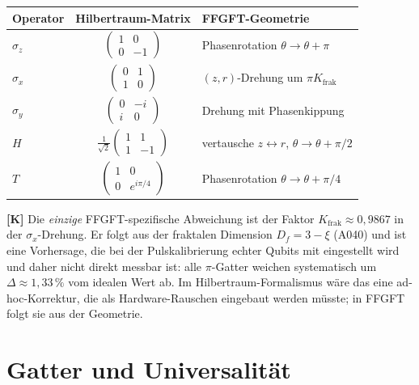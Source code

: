 \begin{center}
\renewcommand{\arraystretch}{1.4}
{\small
\begin{tabular}{lcl}
\toprule
\textbf{Operator} & \textbf{Hilbertraum-Matrix} & \textbf{FFGFT-Geometrie} \\
\midrule
$\sigma_z$ & $\begin{pmatrix}1&0\\0&-1\end{pmatrix}$ & Phasenrotation $\theta\to\theta+\pi$ \\
$\sigma_x$ & $\begin{pmatrix}0&1\\1&0\end{pmatrix}$ & $(z,r)$-Drehung um $\pi K_{\text{frak}}$ \\
$\sigma_y$ & $\begin{pmatrix}0&-i\\i&0\end{pmatrix}$ & Drehung mit Phasenkippung \\
$H$ & $\tfrac{1}{\sqrt2}\begin{pmatrix}1&1\\1&-1\end{pmatrix}$ & vertausche $z\leftrightarrow r$, $\theta\to\theta+\pi/2$ \\
$T$ & $\begin{pmatrix}1&0\\0&e^{i\pi/4}\end{pmatrix}$ & Phasenrotation $\theta\to\theta+\pi/4$ \\
\bottomrule
\end{tabular}
}
\renewcommand{\arraystretch}{1.0}
\end{center}

\textbf{[K]} Die \emph{einzige} FFGFT-spezifische Abweichung ist der Faktor
$K_{\text{frak}}\approx0{,}9867$ in der $\sigma_x$-Drehung. Er folgt aus der
fraktalen Dimension $D_f = 3-\xi$ (A040) und ist eine Vorhersage, die bei der Pulskalibrierung echter Qubits mit eingestellt wird und daher nicht direkt messbar ist: alle
$\pi$-Gatter weichen systematisch um $\Delta\approx1{,}33\,\%$ vom idealen Wert
ab. Im Hilbertraum-Formalismus wäre das eine ad-hoc-Korrektur, die als
Hardware-Rauschen eingebaut werden müsste; in FFGFT folgt sie aus der Geometrie.

\section{Gatter und Universalität}

